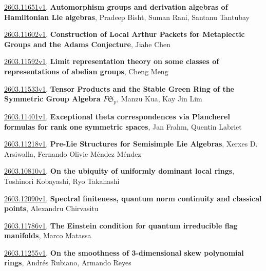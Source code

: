\documentclass[9pt, a4paper]{article}
\theoremstyle{plain}
\theoremstyle{definition}
\theoremstyle{remark}
\newcommand{\arxiv}[3]{\href{https://arxiv.org/abs/#1}{#1}, \textbf{\textcolor{arxivblue}{#2}}, #3}
\begin{document}
\arxiv{2603.11651v1}{Automorphism groups and derivation algebras of Hamiltonian Lie algebras}{Pradeep Bisht, Suman Rani, Santanu Tantubay}

\arxiv{2603.11602v1}{Construction of Local Arthur Packets for Metaplectic Groups and the Adams Conjecture}{Jiahe Chen}

\arxiv{2603.11592v1}{Limit representation theory on some classes of representations of abelian groups}{Cheng Meng}

\arxiv{2603.11533v1}{Tensor Products and the Stable Green Ring of the Symmetric Group Algebra $F\mathfrak{S}_p$}{Manzu Kua, Kay Jin Lim}

\arxiv{2603.11401v1}{Exceptional theta correspondences via Plancherel formulas for rank one symmetric spaces}{Jan Frahm, Quentin Labriet}

\arxiv{2603.11218v1}{Pre-Lie Structures for Semisimple Lie Algebras}{Xerxes D. Arsiwalla, Fernando Olivie Méndez Méndez}

\arxiv{2603.10810v1}{On the ubiquity of uniformly dominant local rings}{Toshinori Kobayashi, Ryo Takahashi}

\arxiv{2603.12090v1}{Spectral finiteness, quantum norm continuity and classical points}{Alexandru Chirvasitu}

\arxiv{2603.11786v1}{The Einstein condition for quantum irreducible flag manifolds}{Marco Matassa}

\arxiv{2603.11255v1}{On the smoothness of 3-dimensional skew polynomial rings}{Andrés Rubiano, Armando Reyes}

\end{document}
